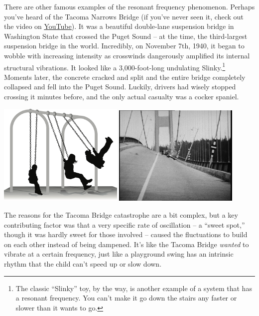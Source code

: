 There are other famous examples of the resonant frequency phenomenon. Perhaps
you've heard of the Tacoma Narrows Bridge (if you've never seen it, check out
the video on
\href{https://www.youtube.com/watch?v=j-zczJXSxnw}{\underline{YouTube}}). It
was a beautiful double-lane suspension bridge in Washington State that crossed
the Puget Sound -- at the time, the third-largest suspension bridge in the
world. Incredibly, on November 7th, 1940, it began to wobble with increasing
intensity as crosswinds dangerously amplified its internal structural
vibrations. It looked like a 3,000-foot-long undulating Slinky.\footnote{The
classic ``Slinky'' toy, by the way, is another example of a system that has a
resonant frequency. You can't make it go down the stairs any faster or slower
than it wants to go.} Moments later, the concrete cracked and split and the
entire bridge completely collapsed and fell into the Puget Sound. Luckily,
drivers had wisely stopped crossing it minutes before, and the only actual
casualty was a cocker spaniel.

\begin{center}
\label{tacoma}
\includegraphics[width=0.45\textwidth]{swing.png}
\quad
\includegraphics[width=0.45\textwidth]{tacoma.jpg}
\end{center}

The reasons for the Tacoma Bridge catastrophe are a bit complex, but a key
contributing factor was that a very specific rate of oscillation -- a ``sweet
spot,'' though it was hardly sweet for those involved -- caused the
fluctuations to build on each other instead of being dampened. It's like the
Tacoma Bridge \textit{wanted} to vibrate at a certain frequency, just like a
playground swing has an intrinsic rhythm that the child can't speed up or slow
down.

